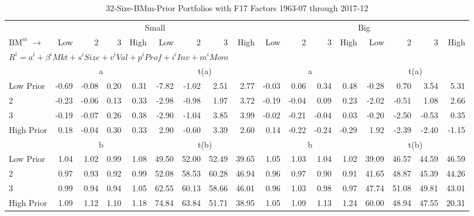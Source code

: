 
\begin{table}[!ht]
\footnotesize
\centering
\caption{32-Size-BMm-Prior Portfolios with F17 Factors 1963-07 through 2017-12}
\begin{tabular}{lrrrrrrrrrrrrrrrr}
  \toprule
     & \multicolumn{8}{c}{Small} & \multicolumn{8}{c}{Big}  \\
     \cmidrule(r){2-9} \cmidrule(r){10-17}
    $\text{BM}^{m}$ $\rightarrow$ & Low & 2 & 3 & High & Low & 2 & 3 & High & Low & 2 & 3 & High & Low & 2 & 3 & High  \\ 
  \midrule
  \multicolumn{17}{l}{$R^i=a^i+\beta^iMkt+s^iSize+v^iVal+p^iProf+i^iInv+m^iMom$}  \\
  
     & \multicolumn{4}{c}{a} & \multicolumn{4}{c}{t(a)}  & \multicolumn{4}{c}{a} & \multicolumn{4}{c}{t(a)}   \\
     \cmidrule(r){2-5} \cmidrule(r){6-9}  \cmidrule(r){10-13} \cmidrule(r){14-17} 
    Low Prior  & -0.69  & -0.08  & 0.20  & 0.31  & -7.82  & -1.02  & 2.51  & 2.77  & -0.03  & 0.06  & 0.34  & 0.48  & -0.28  & 0.70  & 3.54  & 5.31   \\
    2  & -0.23  & -0.06  & 0.13  & 0.33  & -2.98  & -0.98  & 1.97  & 3.72  & -0.19  & -0.04  & 0.09  & 0.23  & -2.02  & -0.51  & 1.08  & 2.66   \\
    3  & -0.19  & -0.07  & 0.26  & 0.38  & -2.90  & -1.04  & 3.85  & 3.99  & -0.02  & -0.21  & -0.04  & 0.03  & -0.20  & -2.50  & -0.53  & 0.35   \\
    High Prior  & 0.18  & -0.04  & 0.30  & 0.33  & 2.90  & -0.60  & 3.39  & 2.60  & 0.14  & -0.22  & -0.24  & -0.29  & 1.92  & -2.39  & -2.40  & -1.15   \\
    
  
     & \multicolumn{4}{c}{b} & \multicolumn{4}{c}{t(b)}  & \multicolumn{4}{c}{b} & \multicolumn{4}{c}{t(b)}   \\
     \cmidrule(r){2-5} \cmidrule(r){6-9}  \cmidrule(r){10-13} \cmidrule(r){14-17} 
    Low Prior  & 1.04  & 1.02  & 0.99  & 1.08  & 49.50  & 52.00  & 52.49  & 39.65  & 1.05  & 1.03  & 1.04  & 1.02  & 39.09  & 46.57  & 44.59  & 46.59   \\
    2  & 0.97  & 0.93  & 0.92  & 0.99  & 52.08  & 58.53  & 60.28  & 46.94  & 0.96  & 0.97  & 0.90  & 0.91  & 41.65  & 48.87  & 45.39  & 44.26   \\
    3  & 0.99  & 0.94  & 0.94  & 1.05  & 62.55  & 60.13  & 58.66  & 46.01  & 0.96  & 1.03  & 0.98  & 0.97  & 47.74  & 51.08  & 49.81  & 43.01   \\
    High Prior  & 1.09  & 1.12  & 1.10  & 1.18  & 74.84  & 63.84  & 51.71  & 38.95  & 1.05  & 1.09  & 1.13  & 1.24  & 60.00  & 48.94  & 47.55  & 20.31   \\
    

\end{tabular}
\end{table}
